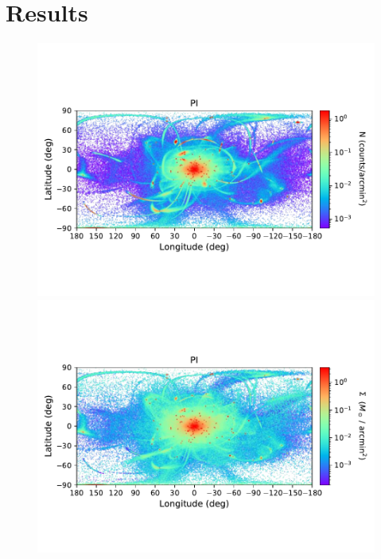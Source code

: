 \section{Results}\label{results}
    \twocolumn
    \begin{figure}[h!]
        \begin{center}
            \includegraphics[clip=true, trim = 0mm 20mm 0mm 20mm, width=0.9\columnwidth]{images/PI_ensemble_LB_count_density.pdf}
            \includegraphics[clip=true, trim = 0mm 20mm 0mm 20mm, width=0.9\columnwidth]{images/PI_ensemble_LB_density_mass.pdf}
            

\end{center}
\end{figure}

